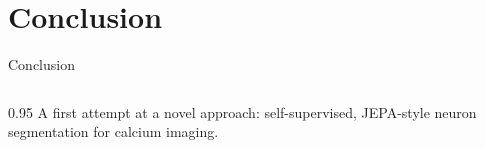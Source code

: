 \section{Conclusion}

\begin{frame}[t]{Conclusion}
\begin{columns}\begin{column}{0.95\textwidth}\color{black}\centering
{\small A first attempt at a novel approach: self-supervised, JEPA-style
 neuron segmentation for calcium imaging.}
\end{column}\end{columns}
\medskip


\end{frame}
